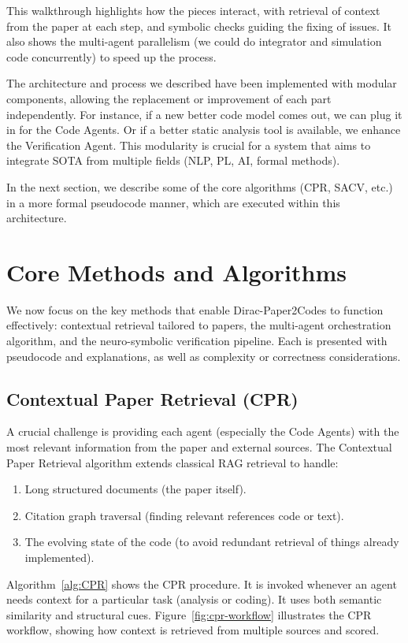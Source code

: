 \documentclass{ieeeaccess}
\begin{document}
This walkthrough highlights how the pieces interact, with retrieval of context from the paper at each step, and symbolic checks guiding the fixing of issues. It also shows the multi-agent parallelism (we could do integrator and simulation code concurrently) to speed up the process.

The architecture and process we described have been implemented with modular components, allowing the replacement or improvement of each part independently. For instance, if a new better code model comes out, we can plug it in for the Code Agents. Or if a better static analysis tool is available, we enhance the Verification Agent. This modularity is crucial for a system that aims to integrate SOTA from multiple fields (NLP, PL, AI, formal methods).

In the next section, we describe some of the core algorithms (CPR, SACV, etc.) in a more formal pseudocode manner, which are executed within this architecture.

\section{Core Methods and Algorithms}\label{sec:methods}
We now focus on the key methods that enable Dirac-Paper2Codes to function effectively: contextual retrieval tailored to papers, the multi-agent orchestration algorithm, and the neuro-symbolic verification pipeline. Each is presented with pseudocode and explanations, as well as complexity or correctness considerations.

\subsection{Contextual Paper Retrieval (CPR)}
A crucial challenge is providing each agent (especially the Code Agents) with the most relevant information from the paper and external sources. The Contextual Paper Retrieval algorithm extends classical RAG retrieval to handle:
\begin{enumerate}
\item Long structured documents (the paper itself).
\item Citation graph traversal (finding relevant references code or text).
\item The evolving state of the code (to avoid redundant retrieval of things already implemented).
\end{enumerate}

Algorithm~\ref{alg:CPR} shows the CPR procedure. It is invoked whenever an agent needs context for a particular task (analysis or coding). It uses both semantic similarity and structural cues. Figure~\ref{fig:cpr-workflow} illustrates the CPR workflow, showing how context is retrieved from multiple sources and scored.
\end{document}
